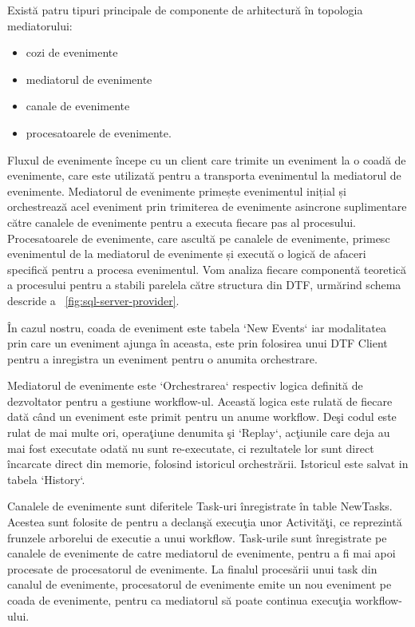 \documentclass[a4paper,12pt]{report}
\begin{document}
\par Există patru tipuri principale de componente de arhitectură în topologia mediatorului: 
\begin{itemize}
\item cozi de evenimente
\item mediatorul de evenimente
\item canale de evenimente
\item procesatoarele de evenimente. 
\end{itemize}
\par Fluxul de evenimente începe cu un client care trimite un eveniment la o coadă de evenimente, care este utilizată pentru a transporta evenimentul la mediatorul de evenimente. Mediatorul de evenimente primește evenimentul inițial și orchestrează acel eveniment prin trimiterea de evenimente asincrone suplimentare către canalele de evenimente pentru a executa fiecare pas al procesului. Procesatoarele de evenimente, care ascultă pe canalele de evenimente, primesc evenimentul de la mediatorul de evenimente și execută o logică de afaceri specifică pentru a procesa evenimentul.  Vom analiza fiecare componentă teoretică a procesului pentru a stabili parelela către structura din DTF, urmărind schema descride a ~\ref{fig:sql-server-provider}.
\par În cazul nostru, coada de eveniment este tabela `New Events` iar modalitatea prin care un eveniment ajunga în aceasta, este prin folosirea unui DTF Client pentru a inregistra un eveniment pentru o anumita orchestrare. 
\par Mediatorul de evenimente este `Orchestrarea` respectiv logica definită de dezvoltator pentru a gestiune workflow-ul. Această logica este rulată de fiecare dată când un eveniment este primit pentru un anume workflow. Deşi codul este rulat de mai multe ori, operaţiune denumita şi `Replay`, acţiunile care deja au mai fost executate odată nu sunt re-executate, ci rezultatele lor sunt direct încarcate direct din memorie, folosind istoricul orchestrării. Istoricul este salvat in tabela `History`.
\par Canalele de evenimente sunt diferitele Task-uri înregistrate în table NewTasks. Acestea sunt folosite de pentru a declanşă execuţia unor Activităţi, ce reprezintă frunzele arborelui de executie a unui workflow. Task-urile sunt înregistrate pe canalele de evenimente de catre mediatorul de evenimente, pentru a fi mai apoi procesate de procesatorul de evenimente. La finalul procesării unui task din canalul de evenimente, procesatorul de evenimente emite un nou eveniment pe coada de evenimente, pentru ca mediatorul să poate continua execuţia workflow-ului. 
\end{document}
